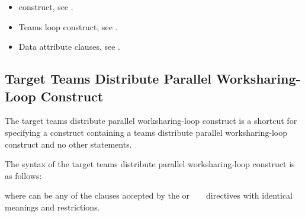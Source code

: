 \crossreferences
\begin{itemize}
\item {} construct, see .

\item Teams loop construct, see .

\item Data attribute clauses, see .
\end{itemize}









\subsection{Target Teams Distribute Parallel Worksharing-Loop Construct}
\label{subsec:Target Teams Distribute Parallel Worksharing-Loop Construct}
\summary
The target teams distribute parallel worksharing-loop construct is a shortcut for specifying a 
construct containing a teams distribute parallel worksharing-loop construct and no other statements.

\syntax
\begin{ccppspecific}
The syntax of the target teams distribute parallel worksharing-loop construct is as follows:

\begin{ompcPragma}[fontsize=\small]
#pragma omp target teams distribute parallel for \plc{\}
            \plc{[clause[ [},\plc{] clause] ... ] new-line}
    \plc{for-loops}
\end{ompcPragma}

where  can be any of the clauses accepted by the  or
~ ~ directives with identical
meanings and restrictions.
\end{ccppspecific}

